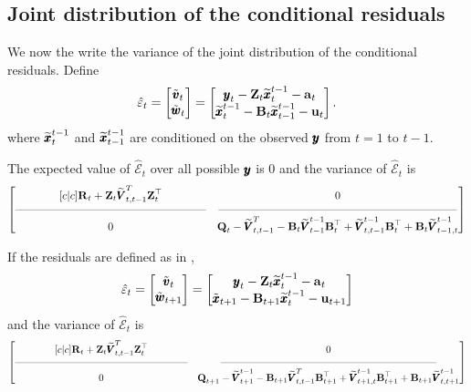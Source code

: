 \documentclass[]{article}
\def\UPS{\mbox{\boldmath $\Upsilon$}}
\def\XI{\mbox{\boldmath $\Xi$}}
\def\BB{\mbox{$\mathbf B$}}	\def\bb{\mbox{$\mathbf b$}} \def\Bb{\mbox{$\mathbf J$}} \def\Ba{\mbox{$\mathbf L$}} \def\Bm{\UPS}
\def\QQ{\mbox{$\mathbf Q$}}	 \def\qq{\mbox{$\mathbf q$}} \def\Qb{\mbox{$\mathbf G$}}  \def\Qm{\mathbb{Q}}
\def\RR{\mbox{$\mathbf R$}}	 \def\rr{\mbox{$\mathbf r$}} \def\Rb{\mbox{$\mathbf H$}}	\def\Rm{\mathbb{R}}
\def\VV{\mbox{$\pmb{V}$}}	\def\vv{\mbox{$\pmb{v}$}}
\def\ZZ{\mbox{$\mathbf Z$}}	\def\zz{\mbox{$\mathbf z$}}	\def\Zb{\mbox{$\mathbf M$}} \def\Za{\mbox{$\mathbf N$}} \def\Zm{\XI}
\def\hatxttm{\widetilde{\xx}_t^{t-1}}
\def\hatxtmtm{\widetilde{\mbox{$\xx$}}_{t-1}^{t-1}}
\def\hatVtmtm{\widetilde{\VV}_{t-1}^{t-1}}
\def\hatVttm{\widetilde{\VV}_{t,t-1}^T}
\def\hatVttmtm{\widetilde{\VV}_{t,t-1}^{t-1}}
\begin{document}
\subsection{Joint distribution of the conditional residuals}
We now the write the variance of the joint distribution of the conditional residuals. Define
\begin{equation}
\hat{\varepsilon}_t = \begin{bmatrix}\tilde{\vv}_t\\ \tilde{\ww}_t\end{bmatrix} =
\begin{bmatrix}\yy_t - \ZZ_t\hatxttm-\aa_t\\ \hatxttm - \BB_t\hatxtmtm-\uu_t \end{bmatrix}.
\end{equation}
where $\hatxttm$ and $\hatxtmtm$ are conditioned on the observed $\mbox{$\pmb{y}$}$ from $t=1$ to $t-1$.

The expected value of $\hat{\mathcal{E}}_t$ over all possible $\mbox{$\pmb{y}$}$ is 0 and the variance of $\hat{\mathcal{E}}_t$  is
\begin{equation}\label{eqn:jointcondresid1innovs}
 \begin{bmatrix}[c|c]
 \RR_t + \ZZ_t \hatVttm \ZZ_t^\top& 0 \\
 \rule[.5ex]{40ex}{0.25pt} & \rule[.5ex]{50ex}{0.25pt} \\
 0 & \QQ_t - \hatVttm - \BB_t \hatVtmtm \BB_t^\top + \hatVttmtm \BB_t^\top + \BB_t\widetilde{\VV}_{t-1,t}^{t-1} \end{bmatrix}
\end{equation}

If the residuals are defined as in \citet{Harveyetal1998},
\begin{equation}
\hat{\varepsilon}_t = \begin{bmatrix}\tilde{\vv}_t\\ \tilde{\ww}_{t+1}\end{bmatrix} =
\begin{bmatrix}\yy_t - \ZZ_t\hatxttm-\aa_t\\ \tilde{\xx}_{t+1} - \BB_{t+1}\hatxttm-\uu_{t+1} \end{bmatrix}
\end{equation}
and the variance of $\hat{\mathcal{E}}_t$ is
\begin{equation}\label{eqn:jointcondresid2.innov.t1}
\begin{bmatrix}[c|c]
\RR_t + \ZZ_t \hatVttm \ZZ_t^\top& 0 \\
\rule[.5ex]{40ex}{0.25pt} & \rule[.5ex]{50ex}{0.25pt} \\
0 & \QQ_{t+1} - \widetilde{\VV}_{t+1}^{t-1} - \BB_{t+1} \hatVttm \BB_{t+1}^\top + \widetilde{\VV}_{t+1,t}^{t-1} \BB_{t+1}^\top + \BB_{t+1}\widetilde{\VV}_{t,t+1}^{t-1} \end{bmatrix}
\end{equation}




\end{document}
